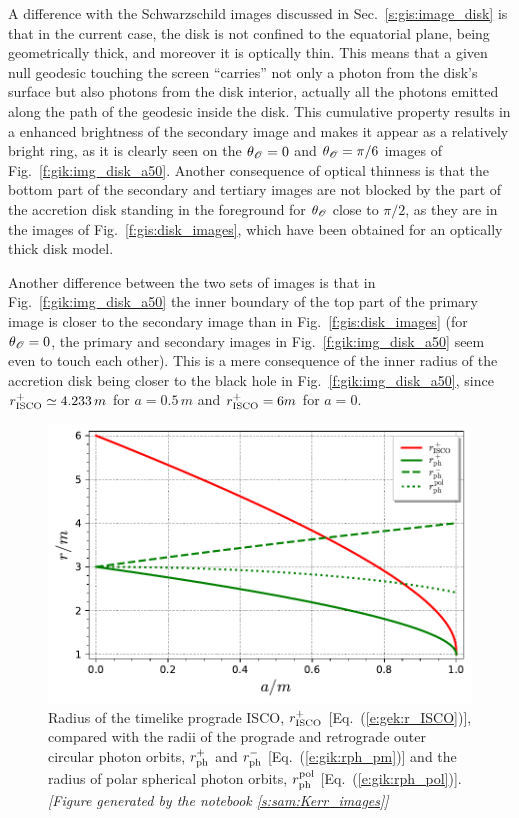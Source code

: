 A difference with the Schwarzschild images discussed in Sec.~\ref{s:gis:image_disk}
is that in the current case, the disk is not confined to the equatorial
plane, being geometrically thick, and moreover it is optically thin. This
means that a given null geodesic touching the screen ``carries'' not only a photon
from the disk's surface but also photons from the disk interior, actually all the photons
emitted along the path of the geodesic inside the disk. This cumulative property
results in a enhanced brightness of the secondary image and makes it appear
as a relatively bright ring, as it is clearly seen on the $\theta_{\mathscr{O}}=0$ and
$\theta_{\mathscr{O}}=\pi/6$ images of Fig.~\ref{f:gik:img_disk_a50}. Another consequence
of optical thinness is that the bottom part of the secondary and tertiary
images are not blocked by the part of the accretion
disk standing in the foreground for $\theta_{\mathscr{O}}$ close to $\pi/2$,
as they are in the images of Fig.~\ref{f:gis:disk_images},
which have been obtained for an optically thick disk model.

Another difference between the two sets of
images is that in
Fig.~\ref{f:gik:img_disk_a50} the inner boundary of the top part of the primary
image is closer to the secondary image than in Fig.~\ref{f:gis:disk_images}
(for $\theta_{\mathscr{O}} = 0$, the primary and secondary images in Fig.~\ref{f:gik:img_disk_a50} seem even to touch each other). This is
a mere consequence of the inner radius of the accretion disk being closer to the
black hole in Fig.~\ref{f:gik:img_disk_a50}, since $r_{\rm ISCO}^+ \simeq 4.233 \, m$
for $a=0.5\, m$ and $r_{\rm ISCO}^+ = 6 m$
for $a=0$.

\begin{figure}
\centerline{\includegraphics[height=0.28\textheight]{gik_rISCO_rph.pdf}}
\caption[]{\label{f:gik:rISCO_rph} \footnotesize
Radius of the timelike prograde ISCO, $r_{\rm ISCO}^+$ [Eq.~(\ref{e:gek:r_ISCO})], compared
with the radii of the prograde and retrograde outer circular photon orbits, $r_{\rm ph}^+$
and $r_{\rm ph}^-$ [Eq.~(\ref{e:gik:rph_pm})] and
the radius of polar spherical photon orbits, $r_{\rm ph}^{\rm pol}$ [Eq.~(\ref{e:gik:rph_pol})].
\textsl{[Figure generated by the notebook \ref{s:sam:Kerr_images}]}
}
\end{figure}

